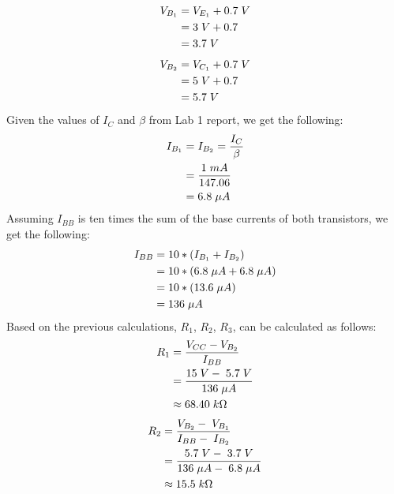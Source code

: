 \documentclass{article}
\begin{document}
	\begin{align*}
		V_{B_1} &= V_{E_1} + 0.7 \hspace{1mm} V\\
		&= 3 \hspace{1mm} V + 0.7\\ 
		&= 3.7 \hspace{1mm} V
	\end{align*}
	\begin{align*}
		V_{B_2} &= V_{C_1} + 0.7 \hspace{1mm} V\\ 
		&= 5 \hspace{1mm} V + 0.7\\ 
		&= 5.7 \hspace{1mm} V
	\end{align*}
	Given the values of $I_C$ and $\beta$ from Lab 1 report, we get the following:
	\begin{align*}
		I_{B_1} &= I_{B_2} = \frac{I_C}{\beta}\\
		&= \frac{1 \hspace{1mm} mA}{147.06}\\
		&= 6.8 \hspace{1mm}\mu A
	\end{align*}
	Assuming $I_{BB}$ is ten times the sum of the base currents of both transistors, we get the following:
	\begin{align*}
		I_{BB} &= 10 * (I_{B_1} + I_{B_2})\\ 
		&= 10 * (6.8 \hspace{1mm}\mu A + 6.8 \hspace{1mm}\mu A)\\ 
		&= 10 * (13.6 \hspace{1mm}\mu A)\\ 
		&= 136 \hspace{1mm}\mu A
	\end{align*}
	Based on the previous calculations, $R_1$, $R_2$, $R_3$, can be calculated as follows:
	\begin{align*}
		R_1 &= \frac{V_{CC} - V_{B_2}}{I_{BB}}\\ 
		&= \frac{15 \hspace{1mm} V - \hspace{1mm} 5.7 \hspace{1mm} V}{136 \hspace{1mm}\mu A}\\ 
		&\approx 68.40 \hspace{1mm} k\Omega
	\end{align*}
	\begin{align*}
		R_2 &= \frac{V_{B_2} - \hspace{1mm} V_{B_1}}{I_{BB} - \hspace{1mm} I_{B_2}}\\ 
		&= \frac{5.7 \hspace{1mm} V - \hspace{1mm} 3.7 \hspace{1mm} V}{136 \hspace{1mm}\mu A - \hspace{1mm} 6.8 \hspace{1mm}\mu A}\\ 
		&\approx 15.5 \hspace{1mm} k\Omega
	\end{align*}
\end{document}
